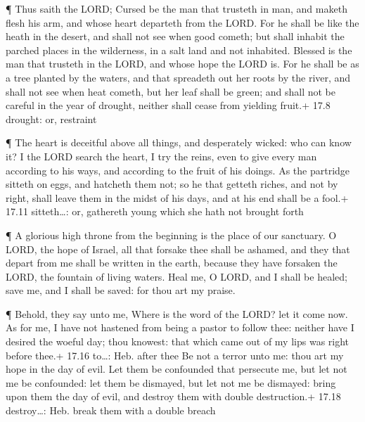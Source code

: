  ¶ Thus saith the LORD; Cursed be the man that trusteth in
man, and maketh flesh his arm, and whose heart departeth from the LORD.
 For he shall be like the heath in the desert, and shall not
see when good cometh; but shall inhabit the parched places in the
wilderness, in a salt land and not inhabited.  Blessed is
the man that trusteth in the LORD, and whose hope the LORD is.
 For he shall be as a tree planted by the waters, and that
spreadeth out her roots by the river, and shall not see when heat
cometh, but her leaf shall be green; and shall not be careful in the
year of drought, neither shall cease from yielding fruit.+ 17.8 drought:
or, restraint

 ¶ The heart is deceitful above all things, and desperately
wicked: who can know it?  I the LORD search the heart, I
try the reins, even to give every man according to his ways, and
according to the fruit of his doings.  As the partridge
sitteth on eggs, and hatcheth them not; so he that getteth riches, and
not by right, shall leave them in the midst of his days, and at his end
shall be a fool.+ 17.11 sitteth\ldots: or, gathereth young which she
hath not brought forth

 ¶ A glorious high throne from the beginning is the place
of our sanctuary.  O LORD, the hope of Israel, all that
forsake thee shall be ashamed, and they that depart from me shall be
written in the earth, because they have forsaken the LORD, the fountain
of living waters.  Heal me, O LORD, and I shall be healed;
save me, and I shall be saved: for thou art my praise.

 ¶ Behold, they say unto me, Where is the word of the LORD?
let it come now.  As for me, I have not hastened from being
a pastor to follow thee: neither have I desired the woeful day; thou
knowest: that which came out of my lips was right before thee.+ 17.16
to\ldots: Heb. after thee  Be not a terror unto me: thou
art my hope in the day of evil.  Let them be confounded
that persecute me, but let not me be confounded: let them be dismayed,
but let not me be dismayed: bring upon them the day of evil, and destroy
them with double destruction.+ 17.18 destroy\ldots: Heb. break them with
a double breach

